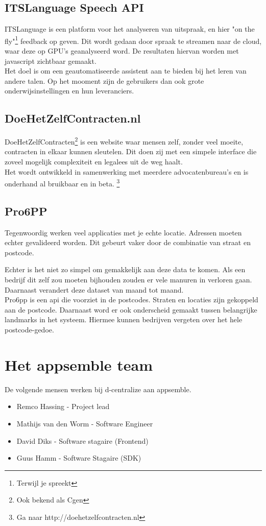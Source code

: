 \subsection{ITSLanguage Speech API}

ITSLanguage is een platform voor het analyseren van uitspraak, en hier "on the fly"\footnote{Terwijl je spreekt} feedback op geven. Dit wordt gedaan door spraak te streamen naar de cloud, waar deze op GPU's geanalyseerd word. De resultaten hiervan worden met javascript zichtbaar gemaakt. \\

Het doel is om een geautomatiseerde assistent aan te bieden  bij het leren van andere talen. Op het mooment zijn de gebruikers dan  ook grote onderwijsinstellingen en hun leveranciers.

\subsection{DoeHetZelfContracten.nl}

DoeHetZelfContracten\footnote{Ook bekend als Cgen} is een website waar mensen zelf, zonder veel moeite, contracten in elkaar kunnen sleutelen. Dit doen zij met een simpele interface die zoveel mogelijk complexiteit en legalees uit de weg haalt. \\

Het wordt ontwikkeld in samenwerking met meerdere advocatenbureau's en is onderhand al bruikbaar en in beta. \footnote{Ga naar http://doehetzelfcontracten.nl}

\subsection{Pro6PP}

Tegenwoordig werken veel applicaties met je echte locatie. Adressen moeten echter gevalideerd worden. Dit gebeurt vaker door de combinatie van straat en postcode.

Echter is het niet zo simpel om gemakkelijk aan deze data te komen. Als een bedrijf dit zelf zou moeten bijhouden zouden er vele manuren in verloren gaan. Daarnaast verandert deze dataset van maand tot maand. \\

Pro6pp is een api die voorziet in de postcodes. Straten en locaties zijn gekoppeld aan de postcode. Daarnaast word er ook onderscheid gemaakt tussen belangrijke landmarks in het systeem. Hiermee kunnen bedrijven vergeten over het hele postcode-gedoe.

\section{Het appsemble team}

De volgende mensen werken bij d-centralize aan appsemble.

\begin{itemize}
	\item Remco Hassing			- Project lead
	\item Mathijs van den Worm	- Software Engineer
	\item David Diks			- Software stagaire (Frontend)
	\item Guus Hamm				- Software Stagaire (SDK)
\end{itemize}